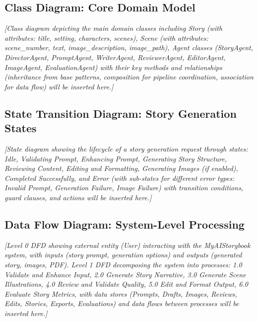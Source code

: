 \subsection{Class Diagram: Core Domain Model}

\vspace{3cm}
\begin{center}
\textit{[Class diagram depicting the main domain classes including Story (with attributes: title, setting, characters, scenes), Scene (with attributes: scene\_number, text, image\_description, image\_path), Agent classes (StoryAgent, DirectorAgent, PromptAgent, WriterAgent, ReviewerAgent, EditorAgent, ImageAgent, EvaluationAgent) with their key methods and relationships (inheritance from base patterns, composition for pipeline coordination, association for data flow) will be inserted here.]}
\end{center}
\vspace{2cm}

\subsection{State Transition Diagram: Story Generation States}

\vspace{3cm}
\begin{center}
\textit{[State diagram showing the lifecycle of a story generation request through states: Idle, Validating Prompt, Enhancing Prompt, Generating Story Structure, Reviewing Content, Editing and Formatting, Generating Images (if enabled), Completed Successfully, and Error (with sub-states for different error types: Invalid Prompt, Generation Failure, Image Failure) with transition conditions, guard clauses, and actions will be inserted here.]}
\end{center}
\vspace{2cm}

\subsection{Data Flow Diagram: System-Level Processing}

\vspace{3cm}
\begin{center}
\textit{[Level 0 DFD showing external entity (User) interacting with the MyAIStorybook system, with inputs (story prompt, generation options) and outputs (generated story, images, PDF). Level 1 DFD decomposing the system into processes: 1.0 Validate and Enhance Input, 2.0 Generate Story Narrative, 3.0 Generate Scene Illustrations, 4.0 Review and Validate Quality, 5.0 Edit and Format Output, 6.0 Evaluate Story Metrics, with data stores (Prompts, Drafts, Images, Reviews, Edits, Stories, Exports, Evaluations) and data flows between processes will be inserted here.]}
\end{center}
\vspace{2cm}

